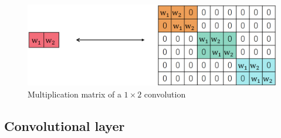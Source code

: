 \begin{descriptionlist}
\begin{description}
                \begin{figure}[H]
                    \centering
                    \includegraphics[width=0.45\linewidth]{./img/convolution_matrix.png}
                    \caption{Multiplication matrix of a $1 \times 2$ convolution}
                \end{figure}
        \end{description}
\end{descriptionlist}


\subsection{Convolutional layer} \label{sec:conv_layer}

